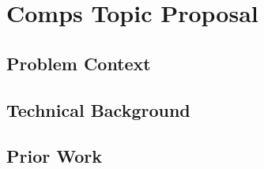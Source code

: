 \documentclass[10pt,twocolumn]{article}
\begin{document}
\section{Comps Topic Proposal}

\subsection{Problem Context}

\subsection{Technical Background}

\subsection{Prior Work}	
\end{document}
